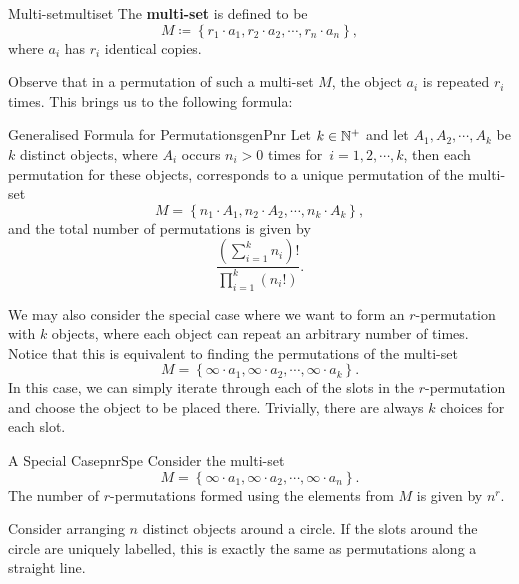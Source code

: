 \documentclass[math]{amznotes}
\theoremstyle{remark}
\begin{document}
\begin{dfnbox}{Multi-set}{multiset}
    The {\color{red} \textbf{multi-set}} is defined to be
    \begin{equation*}
        M \coloneqq \left\{r_1 \cdot a_1, r_2 \cdot a_2, \cdots, r_n \cdot a_n\right\},
    \end{equation*}
    where $a_i$ has $r_i$ identical copies.
\end{dfnbox}
Observe that in a permutation of such a multi-set $M$, the object $a_i$ is repeated $r_i$ times. This brings us to the following formula:
\begin{probox}{Generalised Formula for Permutations}{genPnr}
    Let $k \in \mathbb{N}^+$ and let $A_1, A_2, \cdots, A_k$ be $k$ distinct objects, where $A_i$ occurs $n_i > 0$ times for~$i = 1, 2, \cdots, k$, then each permutation for these objects, corresponds to a unique permutation of the multi-set
    \begin{displaymath}
        M = \left\{n_1 \cdot A_1, n_2 \cdot A_2, \cdots, n_k \cdot A_k\right\},
    \end{displaymath}
    and the total number of permutations is given by
    \begin{equation*}
        \frac{\left(\sum_{i = 1}^{k}n_i\right)!}{\prod_{i = 1}^{k}\left(n_i!\right)}.
    \end{equation*}
\end{probox}
We may also consider the special case where we want to form an $r$-permutation with $k$ objects, where each object can repeat an arbitrary number of times. Notice that this is equivalent to finding the permutations of the multi-set
\begin{displaymath}
    M = \left\{\infty \cdot a_1, \infty \cdot a_2, \cdots, \infty \cdot a_k\right\}.
\end{displaymath}
In this case, we can simply iterate through each of the slots in the $r$-permutation and choose the object to be placed there. Trivially, there are always $k$ choices for each slot.
\begin{probox}{A Special Case}{pnrSpe}
    Consider the multi-set
    \begin{displaymath}
        M = \left\{\infty \cdot a_1, \infty \cdot a_2, \cdots, \infty \cdot a_n\right\}.
    \end{displaymath}
    The number of $r$-permutations formed using the elements from $M$ is given by $n^r$.
\end{probox}
Consider arranging $n$ distinct objects around a circle. If the slots around the circle are uniquely labelled, this is exactly the same as permutations along a straight line.
\end{document}
